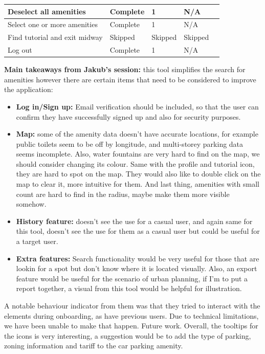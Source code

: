 \begin{table}[h!]
\begin{tabular}{|p{}|p{}|p{}|p{}|p{}|}
        \hline
        Deselect all amenities        & Complete        & 1                   & N/A                \\
        \hline
        Select one or more amenities  & Complete        & 1                   & N/A                \\
        \hline
        Find tutorial and exit midway & Skipped         & Skipped             & Skipped            \\
        \hline
        Log out                       & Complete        & 1                   & N/A                \\
        \hline
    \end{tabular}
\end{table}
\noindent\textbf{Main takeaways from Jakub's session: }this tool simplifies the
search for amenities however there are certain items that need to be considered
to improve the application:

\begin{itemize}
    \item \textbf{Log in/Sign up: }Email verification should be included, so
    that the user can confirm they have successfully signed up and also for
    security purposes.
    \vspace{0.2cm}

    \item \textbf{Map: }some of the amenity data doesn't have accurate
    locations, for example public toilets seem to be off by longitude, and
    multi-storey parking data seems incomplete. Also, water fountains are very
    hard to find on the map, we should consider changing its colour. Same with
    the profile and tutorial icon, they are hard to spot on the map. They would
    also like to double click on the map to clear it, more intuitive for them.
    And last thing, amenities with small count are hard to find in the radius,
    maybe make them more visible somehow.
    \vspace{0.2cm}

    \item \textbf{History feature: }doesn't see the use for a casual user, and
    again same for this tool, doesn't see the use for them as a casual user but
    could be useful for a target user.
    \vspace{0.2cm}

    \item \textbf{Extra features: }Search functionality would be very useful for
    those that are lookin for a spot but don't know where it is located
    visually. Also, an export feature would be useful for the scenario of urban
    planning, if I'm to put a report together, a visual from this tool would be
    helpful for illustration.
\end{itemize}
A notable behaviour indicator from them was that they tried to interact with the
elements during onboarding, as have previous users. Due to technical
limitations, we have been unable to make that happen. Future work.
Overall, the tooltips for the icons is very interesting, a suggestion would be
to add the type of parking, zoning information and tariff to the car parking
amenity.

